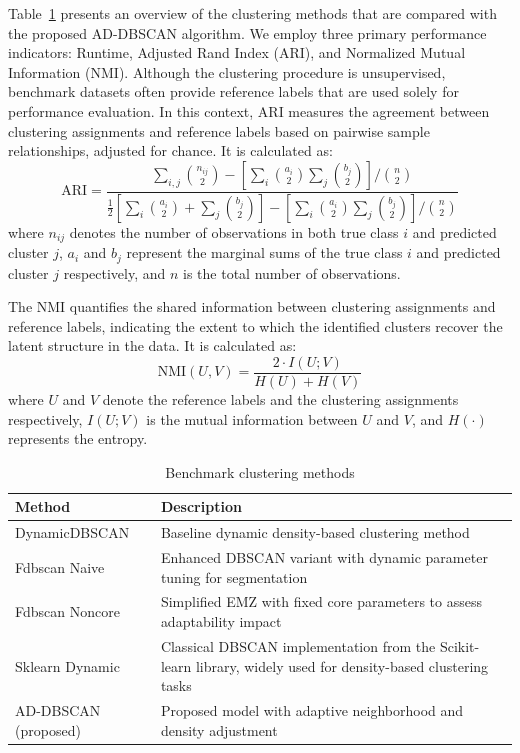 \documentclass[preprint,12pt,authoryear]{elsarticle}
\theoremstyle{definition}
\begin{document}
Table~\ref{tab:clustering_methods} presents an overview of the clustering methods that are compared with the proposed AD-DBSCAN algorithm. We employ three primary performance indicators: Runtime, Adjusted Rand Index (ARI), and Normalized Mutual Information (NMI). Although the clustering procedure is unsupervised, benchmark datasets often provide reference labels that are used solely for performance evaluation. In this context, ARI measures the agreement between clustering assignments and reference labels based on pairwise sample relationships, adjusted for chance.  It is calculated as:
\begin{equation}
\label{eq:ari}
\text{ARI} = \frac{\sum_{i,j}\binom{n_{ij}}{2} - \left[\sum_i\binom{a_i}{2}\sum_j\binom{b_j}{2}\right] \big/ \binom{n}{2}}{\frac{1}{2}\left[\sum_i\binom{a_i}{2} + \sum_j\binom{b_j}{2}\right] - \left[\sum_i\binom{a_i}{2}\sum_j\binom{b_j}{2}\right] \big/ \binom{n}{2}}
\end{equation}
\noindent where $n_{ij}$ denotes the number of observations in both true class $i$ and predicted cluster $j$, $a_i$ and $b_j$ represent the marginal sums of the true class $i$ and predicted cluster $j$ respectively, and $n$ is the total number of observations.

The NMI quantifies the shared information between clustering assignments and reference labels, indicating the extent to which the identified clusters recover the latent structure in the data. It is calculated as:
\begin{equation}
\label{eq:nmi}
\text{NMI}(U,V) = \frac{2 \cdot I(U;V)}{H(U) + H(V)}
\end{equation}
where $U$ and $V$ denote the reference labels and the clustering assignments respectively, $I(U;V)$ is the mutual information between $U$ and $V$, and $H(\cdot)$ represents the entropy.


\begin{table}[H]
\centering
\caption{Benchmark clustering methods}
\begin{tabularx}{\linewidth}{lX}
\hline
\textbf{Method} & \textbf{Description} \\
\hline
\addlinespace
DynamicDBSCAN \citep{shin2025dynamic} & Baseline dynamic density-based clustering method \\
\addlinespace
Fdbscan Naive \citep{esfandiari2021almost} & Enhanced DBSCAN variant with dynamic parameter tuning for segmentation \\
\addlinespace
Fdbscan Noncore & Simplified EMZ with fixed core parameters to assess adaptability impact \\
\addlinespace
Sklearn Dynamic \citep{pedregosa2011scikit} & Classical DBSCAN implementation from the Scikit-learn library, widely used for density-based clustering tasks \\
\addlinespace
AD-DBSCAN (proposed) & Proposed model with adaptive neighborhood and density adjustment \\
\hline
\end{tabularx}
\label{tab:clustering_methods}
\end{table}
\end{document}
